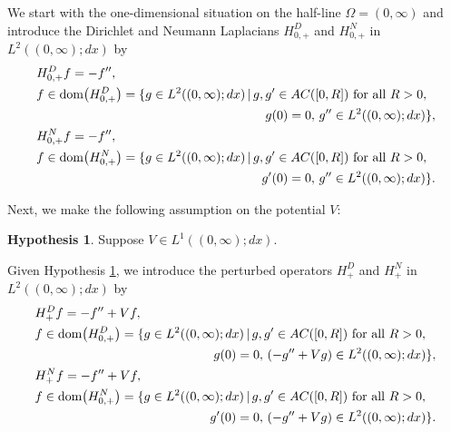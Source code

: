 \documentclass[reqno,10pt, centertags]{amsart}
\newcommand{\no}{\nonumber}
\newcommand{\lb}{\label}
\newcommand{\Om}{\Omega}
\newcommand{\dom}{\text{\rm{dom}}}
\numberwithin{equation}{section}
\theoremstyle{definition}
\newtheorem{hypothesis}[theorem]{Hypothesis}
\begin{document}
We start with the one-dimensional situation on the half-line
$\Om=(0,\infty)$ and introduce the Dirichlet and Neumann
Laplacians $H_{0,+}^D$ and $H_{0,+}^N$ in $L^2((0,\infty);dx)$ by
\begin{align}
&H_{0,+}^Df=-f'',  \no \\
&f\in \dom\big(H_{0,+}^D\big)=\{g\in L^2((0,\infty); dx) \,|\, g,g'
\in AC([0,R])
\text{ for all $R>0$}, \\
& \hspace*{6.35cm} g(0)=0, \, g''\in L^2((0,\infty); dx)\},  \no \\
&H_{0,+}^Nf=-f'',   \no \\
&f\in \dom\big(H_{0,+}^N\big)=\{g\in L^2((0,\infty); dx) \,|\, g,g'
\in AC([0,R])
\text{ for all $R>0$}, \\
& \hspace*{6.25cm} g'(0)=0, \, g''\in L^2((0,\infty); dx)\}.  \no
\end{align}

Next, we make the following assumption on the potential $V$:

\begin{hypothesis} \lb{h6.6}
Suppose $V\in L^1((0,\infty);dx)$.
\end{hypothesis}

Given Hypothesis \ref{h6.6}, we introduce the perturbed operators
$H_+^D$ and $H_+^N$ in $L^2((0,\infty);dx)$ by
\begin{align}
&H_{+}^Df=-f''+Vf,  \no \\
&f\in \dom\big(H_{0,+}^D\big)=\{g\in L^2((0,\infty); dx) \,|\, g,g'
\in AC([0,R])
\text{ for all $R>0$}, \\
& \hspace*{4.95cm} g(0)=0, \, (-g''+Vg)\in L^2((0,\infty); dx)\}, \no \\
&H_{+}^Nf=-f''+Vf,  \no \\
&f\in \dom\big(H_{0,+}^N\big)=\{g\in L^2((0,\infty); dx) \,|\, g,g'
\in AC([0,R])
\text{ for all $R>0$}, \\
& \hspace*{4.85cm} g'(0)=0, \, (-g''+Vg)\in L^2((0,\infty); dx)\}. \no
\end{align}
\end{document}
